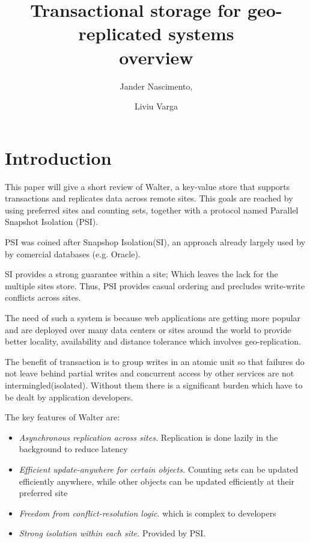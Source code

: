 \documentclass[a4paper]{article}
\begin{document}
\title{Transactional storage for geo-replicated systems \\ overview}

\author{Jander Nascimento,
\and Liviu Varga}

\maketitle


\section{Introduction}
This paper will give a short review of Walter, a key-value store that supports transactions and replicates data across remote sites. This goals are reached by using preferred sites and counting sets, together with a protocol named Parallel Snapshot Isolation (PSI). 

PSI was coined after Snapshop Isolation(SI), an approach already largely used by by comercial databases (e.g. Oracle). 

SI provides a strong guarantee within a site; Which leaves the lack for the multiple sites store. Thus, PSI provides casual ordering and precludes write-write conflicts across sites.

The need of such a system is because web applications are getting more popular and are deployed over many data centers or sites around the world to provide better locality, availability and distance tolerance which involves geo-replication. 

The benefit of transaction is to group writes in an atomic unit so that failures do not leave behind partial writes and concurrent access by other services are not intermingled(isolated). Without them there is a significant burden which have to be dealt by application developers. 

The key features of Walter are:

\begin{itemize}
\item \textit{Asynchronous replication across sites.} Replication is done lazily in the background to reduce latency
\item \textit{Efficient update-anywhere for certain objects.} Counting sets can be updated efficiently anywhere, while other objects can be updated efficiently at their preferred site
\item \textit{Freedom from conflict-resolution logic}. which is complex to developers
\item \textit{Strong isolation within each site.} Provided by PSI.
\end{itemize}
          
\end{document}
